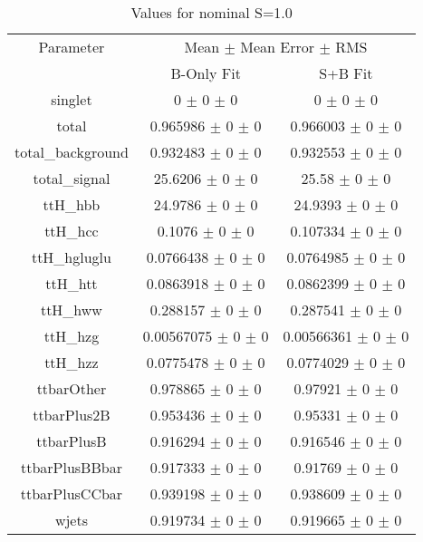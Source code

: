 \begin{table}
\centering
\caption{Values for nominal S=1.0}
\begin{tabular}{ccc}
\toprule
Parameter 	& \multicolumn{2}{c}{Mean $\pm$ Mean Error $\pm$ RMS}\\
 	& B-Only Fit & S+B Fit\\
\midrule
singlet 	& \num{0} $\pm$ \num{0} $\pm$ \num{0} 	& \num{0} $\pm$ \num{0} $\pm$ \num{0}\\
total 	& \num{0.965986} $\pm$ \num{0} $\pm$ \num{0} 	& \num{0.966003} $\pm$ \num{0} $\pm$ \num{0}\\
total\_background 	& \num{0.932483} $\pm$ \num{0} $\pm$ \num{0} 	& \num{0.932553} $\pm$ \num{0} $\pm$ \num{0}\\
total\_signal 	& \num{25.6206} $\pm$ \num{0} $\pm$ \num{0} 	& \num{25.58} $\pm$ \num{0} $\pm$ \num{0}\\
ttH\_hbb 	& \num{24.9786} $\pm$ \num{0} $\pm$ \num{0} 	& \num{24.9393} $\pm$ \num{0} $\pm$ \num{0}\\
ttH\_hcc 	& \num{0.1076} $\pm$ \num{0} $\pm$ \num{0} 	& \num{0.107334} $\pm$ \num{0} $\pm$ \num{0}\\
ttH\_hgluglu 	& \num{0.0766438} $\pm$ \num{0} $\pm$ \num{0} 	& \num{0.0764985} $\pm$ \num{0} $\pm$ \num{0}\\
ttH\_htt 	& \num{0.0863918} $\pm$ \num{0} $\pm$ \num{0} 	& \num{0.0862399} $\pm$ \num{0} $\pm$ \num{0}\\
ttH\_hww 	& \num{0.288157} $\pm$ \num{0} $\pm$ \num{0} 	& \num{0.287541} $\pm$ \num{0} $\pm$ \num{0}\\
ttH\_hzg 	& \num{0.00567075} $\pm$ \num{0} $\pm$ \num{0} 	& \num{0.00566361} $\pm$ \num{0} $\pm$ \num{0}\\
ttH\_hzz 	& \num{0.0775478} $\pm$ \num{0} $\pm$ \num{0} 	& \num{0.0774029} $\pm$ \num{0} $\pm$ \num{0}\\
ttbarOther 	& \num{0.978865} $\pm$ \num{0} $\pm$ \num{0} 	& \num{0.97921} $\pm$ \num{0} $\pm$ \num{0}\\
ttbarPlus2B 	& \num{0.953436} $\pm$ \num{0} $\pm$ \num{0} 	& \num{0.95331} $\pm$ \num{0} $\pm$ \num{0}\\
ttbarPlusB 	& \num{0.916294} $\pm$ \num{0} $\pm$ \num{0} 	& \num{0.916546} $\pm$ \num{0} $\pm$ \num{0}\\
ttbarPlusBBbar 	& \num{0.917333} $\pm$ \num{0} $\pm$ \num{0} 	& \num{0.91769} $\pm$ \num{0} $\pm$ \num{0}\\
ttbarPlusCCbar 	& \num{0.939198} $\pm$ \num{0} $\pm$ \num{0} 	& \num{0.938609} $\pm$ \num{0} $\pm$ \num{0}\\
wjets 	& \num{0.919734} $\pm$ \num{0} $\pm$ \num{0} 	& \num{0.919665} $\pm$ \num{0} $\pm$ \num{0}\\
\bottomrule
\end{tabular}
\end{table}
